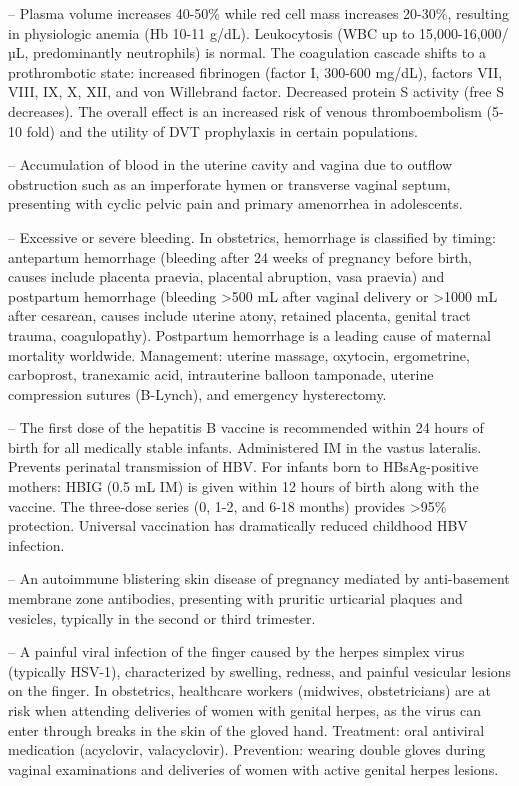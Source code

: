 -- Plasma volume increases 40-50\% while red cell mass increases 20-30\%, resulting in physiologic anemia (Hb 10-11 g/dL). Leukocytosis (WBC up to 15,000-16,000/µL, predominantly neutrophils) is normal. The coagulation cascade shifts to a prothrombotic state: increased fibrinogen (factor I, 300-600 mg/dL), factors VII, VIII, IX, X, XII, and von Willebrand factor. Decreased protein S activity (free S decreases). The overall effect is an increased risk of venous thromboembolism (5-10 fold) and the utility of DVT prophylaxis in certain populations.

-- Accumulation of blood in the uterine cavity and vagina due to outflow obstruction such as an imperforate hymen or transverse vaginal septum, presenting with cyclic pelvic pain and primary amenorrhea in adolescents.

-- Excessive or severe bleeding. In obstetrics, hemorrhage is classified by timing: antepartum hemorrhage (bleeding after 24 weeks of pregnancy before birth, causes include placenta praevia, placental abruption, vasa praevia) and postpartum hemorrhage (bleeding >500 mL after vaginal delivery or >1000 mL after cesarean, causes include uterine atony, retained placenta, genital tract trauma, coagulopathy). Postpartum hemorrhage is a leading cause of maternal mortality worldwide. Management: uterine massage, oxytocin, ergometrine, carboprost, tranexamic acid, intrauterine balloon tamponade, uterine compression sutures (B-Lynch), and emergency hysterectomy.

-- The first dose of the hepatitis B vaccine is recommended within 24 hours of birth for all medically stable infants. Administered IM in the vastus lateralis. Prevents perinatal transmission of HBV. For infants born to HBsAg-positive mothers: HBIG (0.5 mL IM) is given within 12 hours of birth along with the vaccine. The three-dose series (0, 1-2, and 6-18 months) provides >95\% protection. Universal vaccination has dramatically reduced childhood HBV infection.

-- An autoimmune blistering skin disease of pregnancy mediated by anti-basement membrane zone antibodies, presenting with pruritic urticarial plaques and vesicles, typically in the second or third trimester.

-- A painful viral infection of the finger caused by the herpes simplex virus (typically HSV-1), characterized by swelling, redness, and painful vesicular lesions on the finger. In obstetrics, healthcare workers (midwives, obstetricians) are at risk when attending deliveries of women with genital herpes, as the virus can enter through breaks in the skin of the gloved hand. Treatment: oral antiviral medication (acyclovir, valacyclovir). Prevention: wearing double gloves during vaginal examinations and deliveries of women with active genital herpes lesions.

